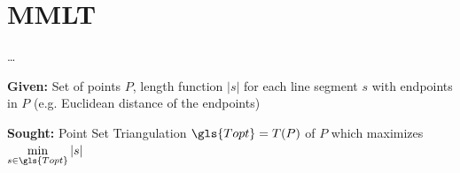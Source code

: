 \chapter{\texorpdfstring{\glsdesc{MMLT}}{MMLT}}\label{cha:mmlt}
\ldots{}



\begin{problem}
  \label{prob:mmlt}\hfill
  \begin{labeling}{\hspace{4em}}
    \item[\textbf{Given:}]
      Set of points \(P\), length function \(|s|\)
      for each line segment \(s\) with endpoints in \(P\)
      (e.g. Euclidean distance of the endpoints)
    \item[\textbf{Sought:}]
      Point Set Triangulation \(\gls{Topt} = T(P)\) of \(P\)
      which maximizes \(\min\limits_{s\in \gls{Topt}} |s|\)
  \end{labeling}
\end{problem}


